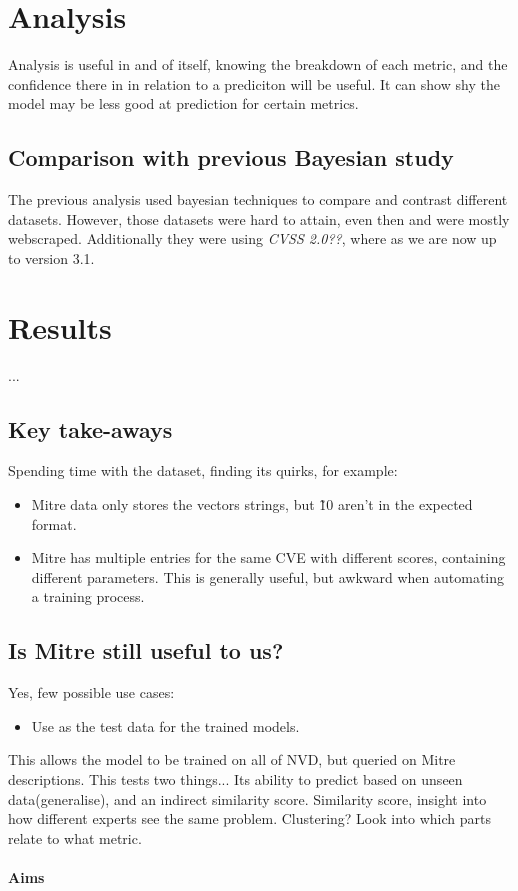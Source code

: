 \documentclass[11pt]{article}
\begin{document}
\section{Analysis}

Analysis is useful in and of itself, knowing the breakdown of each metric, and the confidence there
in in relation to a prediciton will be useful. It can show shy the model may be less good at
prediction for certain metrics.

\subsection{Comparison with previous Bayesian study}

The previous analysis used bayesian techniques to compare and contrast different datasets. However,
those datasets were hard to attain, even then and were mostly webscraped. Additionally they were
using \textit{CVSS 2.0??}, where as we are now up to version 3.1.

\section{Results}
...


\subsection{Key take-aways}

Spending time with the dataset, finding its quirks, for example:

\begin{itemize}
	\item Mitre data only stores the vectors strings, but \~10 aren't in the expected format.
	\item Mitre has multiple entries for the same CVE with different scores, containing different
	      parameters. This is generally useful, but awkward when automating a training process.
\end{itemize}

\subsection{Is Mitre still useful to us?}

Yes, few possible use cases:

\begin{itemize}
	\item Use as the test data for the trained models.
\end{itemize}

This allows the model to be trained on all of NVD, but queried on Mitre descriptions. This tests two
things... Its ability to predict based on unseen data(generalise), and an indirect similarity score.
Similarity score, insight into how different experts see the same problem.
Clustering? Look into which parts relate to what metric.



\paragraph{Aims}
\noindent
\end{document}
